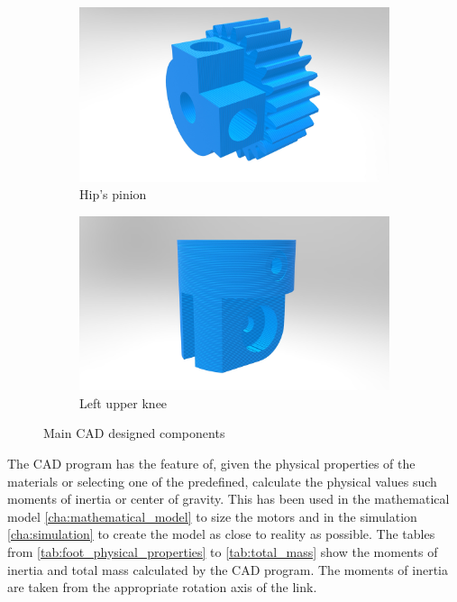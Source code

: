 \begin{figure}[ht!]
    \ContinuedFloat %
    \begin{subfigure}[b]{0.49\textwidth}
        \includegraphics[width=\textwidth]{figures/legs_hip_pinion.jpg}
        \caption{Hip's pinion}
        \label{fig:hip_pinion}
    \end{subfigure}
    \begin{subfigure}[b]{0.49\textwidth}
        \includegraphics[width=\textwidth]{figures/legs_knee_upper.jpg}
        \caption{Left upper knee}
        \label{fig:knee_upper}
    \end{subfigure}
    \caption{Main CAD designed components}
\end{figure}

The CAD program has the feature of, given the physical properties of the materials or selecting one of the predefined, calculate the physical values such moments of inertia or center of gravity.
This has been used in the mathematical model \ref{cha:mathematical_model} to size the motors and in the simulation \ref{cha:simulation} to create the model as close to reality as possible.
The tables from \ref{tab:foot_physical_properties} to \ref{tab:total_mass} show the moments of inertia and total mass calculated by the CAD program.
The moments of inertia are taken from the appropriate rotation axis of the link.

